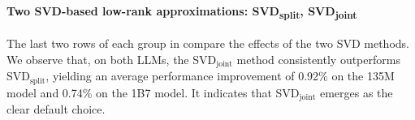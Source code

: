 % 
\paragraph{Two SVD-based low-rank approximations: SVD\textsubscript{split}, SVD\textsubscript{joint}}
The last two rows of each group in  compare the effects of the two SVD methods. 
We observe that, on both LLMs, the SVD\(_{\text{joint}}\) method consistently outperforms SVD\(_{\text{split}}\), yielding an average performance improvement of 0.92\% on the 135M model and 0.74\% on the 1B7 model. 
It indicates that SVD\(_{\text{joint}}\) emerges as the clear default choice.

